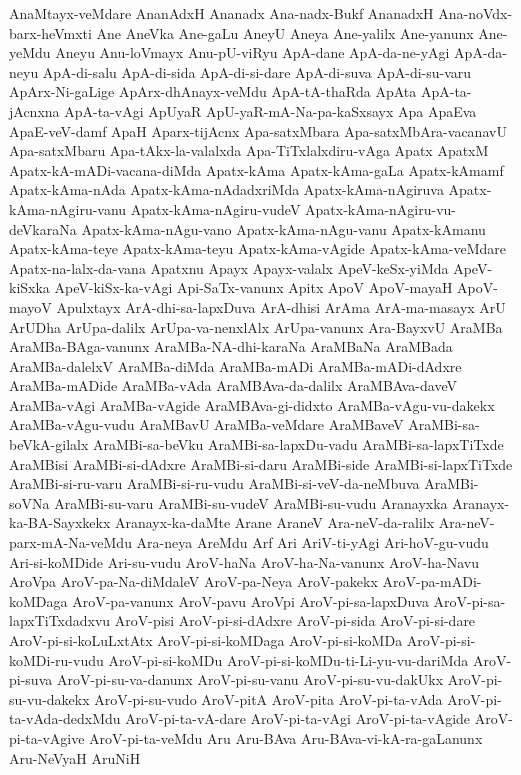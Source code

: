 {AnaMtayx-veMdare
AnanAdxH
Ananadx
Ana-nadx-Bukf
AnanadxH
Ana-noVdx-barx-heVmxti
Ane
AneVka
Ane-gaLu
AneyU
Aneya
Ane-yalilx
Ane-yanunx
Ane-yeMdu
Aneyu
Anu-loVmayx
Anu-pU-viRyu
ApA-dane
ApA-da-ne-yAgi
ApA-da-neyu
ApA-di-salu
ApA-di-sida
ApA-di-si-dare
ApA-di-suva
ApA-di-su-varu
ApArx-Ni-gaLige
ApArx-dhAnayx-veMdu
ApA-tA-thaRda
ApAta
ApA-ta-jAcnxna
ApA-ta-vAgi
ApUyaR
ApU-yaR-mA-Na-pa-kaSxsayx
Apa
ApaEva
ApaE-veV-damf
ApaH
Aparx-tijAcnx
Apa-satxMbara
Apa-satxMbAra-vacanavU
Apa-satxMbaru
Apa-tAkx-la-valalxda
Apa-TiTxlalxdiru-vAga
Apatx
ApatxM
Apatx-kA-mADi-vacana-diMda
Apatx-kAma
Apatx-kAma-gaLa
Apatx-kAmamf
Apatx-kAma-nAda
Apatx-kAma-nAdadxriMda
Apatx-kAma-nAgiruva
Apatx-kAma-nAgiru-vanu
Apatx-kAma-nAgiru-vudeV
Apatx-kAma-nAgiru-vu-deVkaraNa
Apatx-kAma-nAgu-vano
Apatx-kAma-nAgu-vanu
Apatx-kAmanu
Apatx-kAma-teye
Apatx-kAma-teyu
Apatx-kAma-vAgide
Apatx-kAma-veMdare
Apatx-na-lalx-da-vana
Apatxnu
Apayx
Apayx-valalx
ApeV-keSx-yiMda
ApeV-kiSxka
ApeV-kiSx-ka-vAgi
Api-SaTx-vanunx
Apitx
ApoV
ApoV-mayaH
ApoV-mayoV
Apulxtayx
ArA-dhi-sa-lapxDuva
ArA-dhisi
ArAma
ArA-ma-masayx
ArU
ArUDha
ArUpa-dalilx
ArUpa-va-nenxlAlx
ArUpa-vanunx
Ara-BayxvU
AraMBa
AraMBa-BAga-vanunx
AraMBa-NA-dhi-karaNa
AraMBaNa
AraMBada
AraMBa-dalelxV
AraMBa-diMda
AraMBa-mADi
AraMBa-mADi-dAdxre
AraMBa-mADide
AraMBa-vAda
AraMBAva-da-dalilx
AraMBAva-daveV
AraMBa-vAgi
AraMBa-vAgide
AraMBAva-gi-didxto
AraMBa-vAgu-vu-dakekx
AraMBa-vAgu-vudu
AraMBavU
AraMBa-veMdare
AraMBaveV
AraMBi-sa-beVkA-gilalx
AraMBi-sa-beVku
AraMBi-sa-lapxDu-vadu
AraMBi-sa-lapxTiTxde
AraMBisi
AraMBi-si-dAdxre
AraMBi-si-daru
AraMBi-side
AraMBi-si-lapxTiTxde
AraMBi-si-ru-varu
AraMBi-si-ru-vudu
AraMBi-si-veV-da-neMbuva
AraMBi-soVNa
AraMBi-su-varu
AraMBi-su-vudeV
AraMBi-su-vudu
Aranayxka
Aranayx-ka-BA-Sayxkekx
Aranayx-ka-daMte
Arane
AraneV
Ara-neV-da-ralilx
Ara-neV-parx-mA-Na-veMdu
Ara-neya
AreMdu
Arf
Ari
AriV-ti-yAgi
Ari-hoV-gu-vudu
Ari-si-koMDide
Ari-su-vudu
AroV-haNa
AroV-ha-Na-vanunx
AroV-ha-Navu
AroVpa
AroV-pa-Na-diMdaleV
AroV-pa-Neya
AroV-pakekx
AroV-pa-mADi-koMDaga
AroV-pa-vanunx
AroV-pavu
AroVpi
AroV-pi-sa-lapxDuva
AroV-pi-sa-lapxTiTxdadxvu
AroV-pisi
AroV-pi-si-dAdxre
AroV-pi-sida
AroV-pi-si-dare
AroV-pi-si-koLuLxtAtx
AroV-pi-si-koMDaga
AroV-pi-si-koMDa
AroV-pi-si-koMDi-ru-vudu
AroV-pi-si-koMDu
AroV-pi-si-koMDu-ti-Li-yu-vu-dariMda
AroV-pi-suva
AroV-pi-su-va-danunx
AroV-pi-su-vanu
AroV-pi-su-vu-dakUkx
AroV-pi-su-vu-dakekx
AroV-pi-su-vudo
AroV-pitA
AroV-pita
AroV-pi-ta-vAda
AroV-pi-ta-vAda-dedxMdu
AroV-pi-ta-vA-dare
AroV-pi-ta-vAgi
AroV-pi-ta-vAgide
AroV-pi-ta-vAgive
AroV-pi-ta-veMdu
Aru
Aru-BAva
Aru-BAva-vi-kA-ra-gaLanunx
Aru-NeVyaH
AruNiH
}
